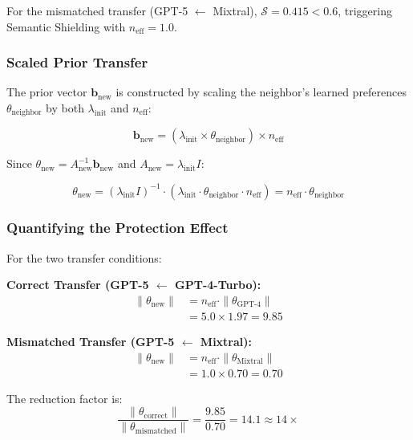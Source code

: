 \documentclass[sigconf,nonacm]{acmart}
\begin{document}
For the mismatched transfer (GPT-5 $\leftarrow$ Mixtral), $\mathcal{S} = 0.415 < 0.6$, triggering Semantic Shielding with $n_{\text{eff}} = 1.0$.

\subsubsection{Scaled Prior Transfer}

The prior vector $\mathbf{b}_{\text{new}}$ is constructed by scaling the neighbor's learned preferences $\theta_{\text{neighbor}}$ by both $\lambda_{\text{init}}$ and $n_{\text{eff}}$:

\begin{equation}
\mathbf{b}_{\text{new}} = (\lambda_{\text{init}} \times \theta_{\text{neighbor}}) \times n_{\text{eff}}
\end{equation}

Since $\theta_{\text{new}} = A_{\text{new}}^{-1} \mathbf{b}_{\text{new}}$ and $A_{\text{new}} = \lambda_{\text{init}} I$:

\begin{equation}
\theta_{\text{new}} = (\lambda_{\text{init}} I)^{-1} \cdot (\lambda_{\text{init}} \cdot \theta_{\text{neighbor}} \cdot n_{\text{eff}}) = n_{\text{eff}} \cdot \theta_{\text{neighbor}}
\end{equation}

\subsubsection{Quantifying the Protection Effect}

For the two transfer conditions:

\textbf{Correct Transfer (GPT-5 $\leftarrow$ GPT-4-Turbo):}
\begin{align}
\|\theta_{\text{new}}\| &= n_{\text{eff}} \cdot \|\theta_{\text{GPT-4}}\| \\
&= 5.0 \times 1.97 = 9.85
\end{align}

\textbf{Mismatched Transfer (GPT-5 $\leftarrow$ Mixtral):}
\begin{align}
\|\theta_{\text{new}}\| &= n_{\text{eff}} \cdot \|\theta_{\text{Mixtral}}\| \\
&= 1.0 \times 0.70 = 0.70
\end{align}

The reduction factor is:
\begin{equation}
\frac{\|\theta_{\text{correct}}\|}{\|\theta_{\text{mismatched}}\|} = \frac{9.85}{0.70} = 14.1 \approx 14\times
\end{equation}
\end{document}
